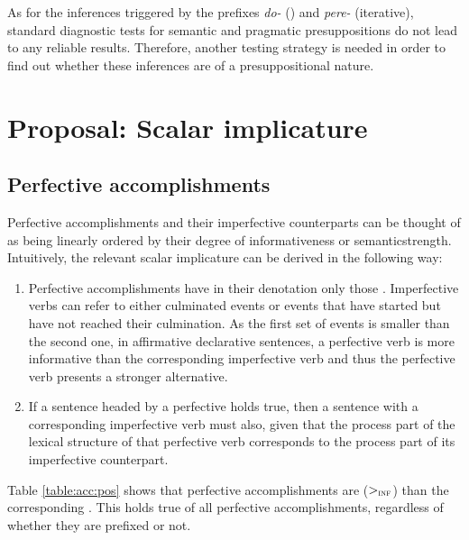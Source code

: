 As for the inferences triggered by the prefixes \textit{do-} () and \textit{pere-} (iterative), standard diagnostic tests for semantic and pragmatic presuppositions do not lead to any reliable results. Therefore, another testing strategy is needed in order to find out whether these inferences are of a presuppositional nature. 

\section{Proposal: Scalar implicature}\label{sec:pragm:new}
\subsection{Perfective accomplishments}\label{sec:pragm:new:perf}
Perfective accomplishments and their imperfective counterparts can be thought of as being linearly ordered by their degree of informativeness or semantic\linebreak strength.
Intuitively, the relevant scalar implicature can be derived in the following way:

\begin{enumerate}
\item
Perfective accomplishments have in their denotation only those . Imperfective verbs can refer to either culminated events or events that have started but have not reached their culmination. As the first set of events is smaller than the second one, in affirmative declarative sentences, a perfective verb is more informative than the corresponding imperfective verb and thus the perfective verb presents a stronger alternative.
\item If a sentence headed by a perfective  holds true, then a sentence with a corresponding imperfective verb must also, given that the process part of the lexical structure of that perfective verb corresponds to the process part of its imperfective counterpart.
\end{enumerate}
Table \ref{table:acc:pos} shows that perfective accomplishments are  ($>_{\textsc{inf}}$) than the corresponding . This holds true of all perfective accomplishments, regardless of whether they are prefixed or not.

